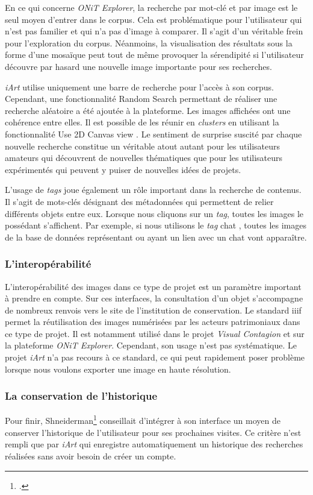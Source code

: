 En ce qui concerne \textit{ONiT Explorer}, la recherche par mot-clé et par image est le seul moyen d'entrer dans le corpus. Cela est problématique pour l'utilisateur qui n'est pas familier et qui n'a pas d'image à comparer. Il s'agit d'un véritable frein pour l'exploration du corpus. Néanmoins, la visualisation des résultats sous la forme d'une mosaïque peut tout de même provoquer la sérendipité si l'utilisateur découvre par hasard une nouvelle image importante pour ses recherches.

\textit{iArt} utilise uniquement une barre de recherche pour l'accès à son corpus. Cependant, une fonctionnalité \og Random Search \fg permettant de réaliser une recherche aléatoire a été ajoutée à la plateforme. Les images affichées ont une cohérence entre elles. Il est possible de les réunir en \textit{clusters} en utilisant la fonctionnalité \og Use 2D Canvas view \fg. Le sentiment de surprise suscité par chaque nouvelle recherche constitue un véritable atout autant pour les utilisateurs amateurs qui découvrent de nouvelles thématiques que pour les utilisateurs expérimentés qui peuvent y puiser de nouvelles idées de projets.

L'usage de \textit{tags} joue également un rôle important dans la recherche de contenus. Il s'agit de mots-clés désignant des métadonnées qui permettent de relier différents objets entre eux. Lorsque nous cliquons sur un \textit{tag}, toutes les images le possédant s'affichent. Par exemple, si nous utilisons le \textit{tag} \og chat \fg, toutes les images de la base de données représentant ou ayant un lien avec un chat vont apparaître.  


\subsubsection{L'interopérabilité}

L'interopérabilité des images dans ce type de projet est un paramètre important à prendre en compte. Sur ces interfaces, la consultation d'un objet s'accompagne de nombreux renvois vers le site de l'institution de conservation. Le standard \gls{iiif} permet la réutilisation des images numérisées par les acteurs patrimoniaux dans ce type de projet. Il est notamment utilisé dans le projet \textit{Visual Contagion} et sur la plateforme \textit{ONiT Explorer}. Cependant, son usage n'est pas systématique. Le projet \textit{iArt} n'a pas recours à ce standard, ce qui peut rapidement poser problème lorsque nous voulons exporter une image en haute résolution.

\subsubsection{La conservation de l'historique}

Pour finir, Shneiderman\footcite{shneidermanEyesHaveIt1996} conseillait d'intégrer à son interface un moyen de conserver l'historique de l'utilisateur pour ses prochaines visites. Ce critère n'est rempli que par \textit{iArt} qui enregistre automatiquement un historique des recherches réalisées sans avoir besoin de créer un compte. \\
